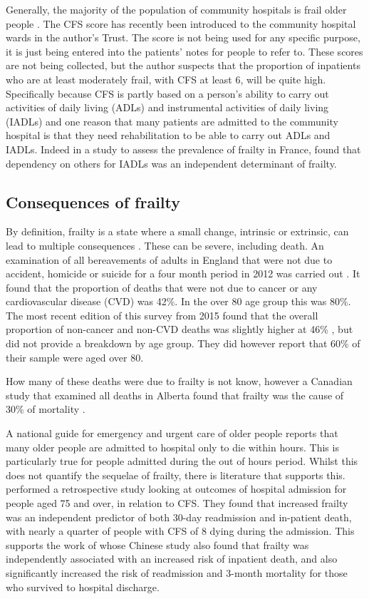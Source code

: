 \documentclass
[
	12pt,
	a4paper,
	oneside,
]{article}
\begin{document}
Generally, the majority of the population of community hospitals is frail older 
people \parencite{silver:12}.
The CFS score has recently been introduced to the community hospital wards in the author's Trust. The
score is not being used for any specific purpose, it is just being entered into 
the patients' notes for people to refer to. These scores are not being collected, 
but the author suspects that the proportion of inpatients who are at least 
moderately frail, with CFS at least 6, will be quite high. Specifically because
CFS is partly based on a person's ability to carry out activities of daily living (ADLs)
and instrumental activities of daily living (IADLs) and one reason that many patients
are admitted to the community hospital is that they need rehabilitation to be
able to carry out ADLs and IADLs. Indeed in a study to assess the prevalence of frailty
in France, \textcite{cossec:16} found that dependency on others for IADLs was an 
independent determinant of frailty.

\subsection{Consequences of frailty}

By definition, frailty is a state where a small change, intrinsic or extrinsic, can
lead to multiple consequences \parencite{collard:12}. These can be severe, including 
death. An examination
of all bereavements of adults in England that were not due to accident, homicide or suicide for 
a four month period in 2012 was 
carried out \parencite{ons:13}. It found that the proportion of deaths
that were not due to cancer or any cardiovascular disease (CVD) was 42\%. In the over 80
age group this was 80\%. The most recent edition of this survey from 2015 found
that the overall proportion of non-cancer and non-CVD deaths was slightly higher 
at 46\% \parencite{ons:16}, but did not provide a breakdown by age group. They 
did however report that 60\% of their sample were aged over 80.

How many of these deaths were due to frailty is not know, however 
a Canadian study that examined all deaths in Alberta found that frailty was the
cause of 30\% of mortality \parencite{fassbender:09}.

A national guide for emergency and urgent care of older people \parencite{silver:12}
reports that many older people are admitted to hospital only to die within hours.
This is particularly true for people admitted during the out of hours period.
Whilst this does not quantify the sequelae of frailty, there is literature that 
supports this. \textcite{wallis:15} performed a retrospective study looking 
at outcomes of hospital admission for people aged 75 and over, in relation to CFS. 
They found that increased frailty was an independent predictor of both 30-day
readmission and in-patient death, with nearly a quarter of people with CFS of 8 dying 
during the admission. This supports the work of \textcite{kang:15} whose Chinese 
study also found that frailty was independently associated with an increased risk of 
inpatient death, and also significantly increased the risk of readmission and 
3-month mortality for those who survived to hospital discharge.
\end{document}

